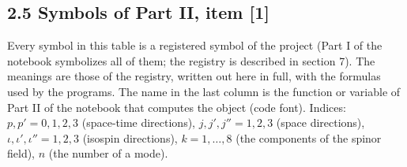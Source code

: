 \documentclass[
  10pt,
]{article}
\begin{document}
\hypertarget{symbols-of-part-ii-item-1}{%
\subsection{2.5 Symbols of Part II, item
{[}1{]}}\label{symbols-of-part-ii-item-1}}

Every symbol in this table is a registered symbol of the project (Part I
of the notebook symbolizes all of them; the registry is described in
section 7). The meanings are those of the registry, written out here in
full, with the formulas used by the programs. The name in the last
column is the function or variable of Part II of the notebook that
computes the object (code font). Indices: \(p,p'=0,1,2,3\) (space-time
directions), \(j,j',j''=1,2,3\) (space directions),
\(\iota,\iota',\iota''=1,2,3\) (isospin directions), \(k=1,\dots,8\)
(the components of the spinor field), \(n\) (the number of a mode).
\end{document}
